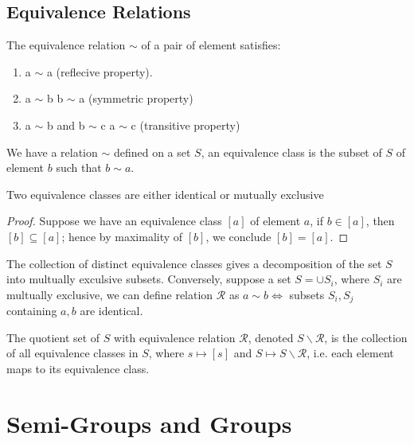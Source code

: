 	\subsection{Equivalence Relations}
		\begin{definition}\label{relations}
		The equivalence relation $\sim$ of a pair of element satisfies:
		\begin{enumerate}
		\item a $\sim$ a (reflecive property).
		\item a $\sim$ b \implies b $\sim$ a (symmetric property)
		\item a $\sim$ b and b $\sim$ c \implies a $\sim$ c (transitive property)
 		\end{enumerate}
		\end{definition}
		\begin{definition}
		We have a relation $\sim$ defined on a set $S$, an equivalence class is the subset of $S$ of element $b$ such that $b\sim a$.
		\end{definition}
		\begin{theorem}
		Two equivalence classes are either identical or mutually exclusive
		\end{theorem}
		\begin{proof}
		Suppose we have an equivalence class $[a]$ of element $a$, if $b\in [a]$, then $[b]\subseteq[a]$; hence by maximality of $[b]$, we conclude $[b]=[a]$.
		\end{proof}
		\begin{corollary}
		The collection of distinct equivalence classes gives a decomposition of the set $S$ into multually exculsive subsets. Conversely, suppose a set $S=\cup S_i$, where $S_i$ are multually exclusive, we can define relation $\mathcal{R}$ as $a\sim b \iff $ subsets $S_i,S_j$ containing $a,b$ are identical.
		\end{corollary}
		\begin{definition}
		The quotient set of $S$ with equivalence relation $\mathcal{R}$, denoted $S\backslash\mathcal{R}$, is the collection of all equivalence classes in $S$, where $s\mapsto[s]$ and $S\mapsto S\backslash\mathcal{R}$, i.e. each element maps to its equivalence class.
		\end{definition}
	\section{Semi-Groups and Groups}

